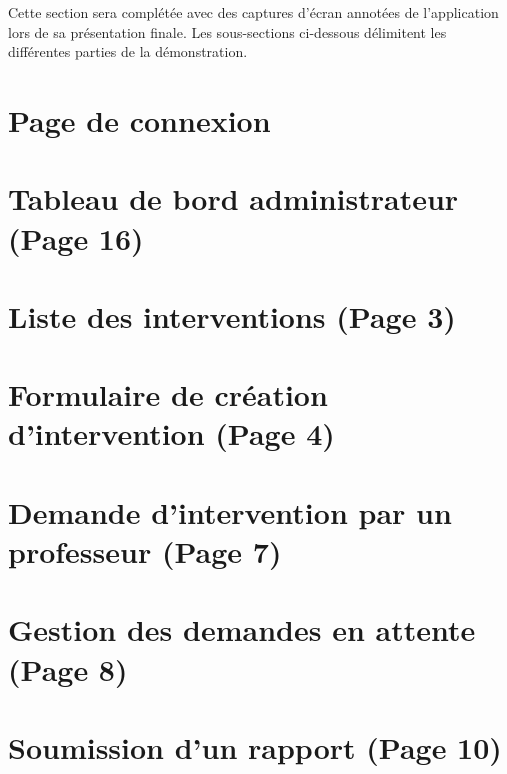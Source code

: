\documentclass[12pt,a4paper,oneside]{report}
\begin{document}
\begin{important}
Cette section sera complétée avec des captures d'écran annotées de l'application lors de sa présentation finale. Les sous-sections ci-dessous délimitent les différentes parties de la démonstration.
\end{important}

\section{Page de connexion}


\section{Tableau de bord administrateur (Page 16)}


\section{Liste des interventions (Page 3)}


\section{Formulaire de création d'intervention (Page 4)}


\section{Demande d'intervention par un professeur (Page 7)}


\section{Gestion des demandes en attente (Page 8)}


\section{Soumission d'un rapport (Page 10)}
\end{document}
